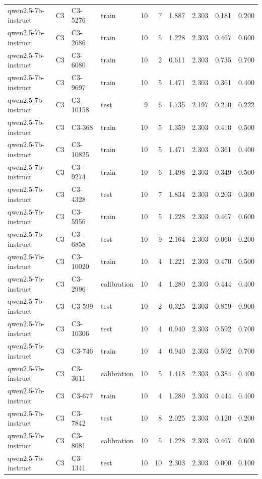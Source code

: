 \begin{table}
\begin{tabular}{llllrrrrrr}
qwen2.5-7b-instruct & C3 & C3-5276 & train & 10 & 7 & 1.887 & 2.303 & 0.181 & 0.200 \\
qwen2.5-7b-instruct & C3 & C3-2686 & train & 10 & 5 & 1.228 & 2.303 & 0.467 & 0.600 \\
qwen2.5-7b-instruct & C3 & C3-6080 & train & 10 & 2 & 0.611 & 2.303 & 0.735 & 0.700 \\
qwen2.5-7b-instruct & C3 & C3-9697 & train & 10 & 5 & 1.471 & 2.303 & 0.361 & 0.400 \\
qwen2.5-7b-instruct & C3 & C3-10158 & test & 9 & 6 & 1.735 & 2.197 & 0.210 & 0.222 \\
qwen2.5-7b-instruct & C3 & C3-368 & train & 10 & 5 & 1.359 & 2.303 & 0.410 & 0.500 \\
qwen2.5-7b-instruct & C3 & C3-10825 & train & 10 & 5 & 1.471 & 2.303 & 0.361 & 0.400 \\
qwen2.5-7b-instruct & C3 & C3-9274 & train & 10 & 6 & 1.498 & 2.303 & 0.349 & 0.500 \\
qwen2.5-7b-instruct & C3 & C3-4328 & test & 10 & 7 & 1.834 & 2.303 & 0.203 & 0.300 \\
qwen2.5-7b-instruct & C3 & C3-5956 & train & 10 & 5 & 1.228 & 2.303 & 0.467 & 0.600 \\
qwen2.5-7b-instruct & C3 & C3-6858 & test & 10 & 9 & 2.164 & 2.303 & 0.060 & 0.200 \\
qwen2.5-7b-instruct & C3 & C3-10020 & train & 10 & 4 & 1.221 & 2.303 & 0.470 & 0.500 \\
qwen2.5-7b-instruct & C3 & C3-2996 & calibration & 10 & 4 & 1.280 & 2.303 & 0.444 & 0.400 \\
qwen2.5-7b-instruct & C3 & C3-599 & test & 10 & 2 & 0.325 & 2.303 & 0.859 & 0.900 \\
qwen2.5-7b-instruct & C3 & C3-10306 & test & 10 & 4 & 0.940 & 2.303 & 0.592 & 0.700 \\
qwen2.5-7b-instruct & C3 & C3-746 & train & 10 & 4 & 0.940 & 2.303 & 0.592 & 0.700 \\
qwen2.5-7b-instruct & C3 & C3-3611 & calibration & 10 & 5 & 1.418 & 2.303 & 0.384 & 0.400 \\
qwen2.5-7b-instruct & C3 & C3-677 & train & 10 & 4 & 1.280 & 2.303 & 0.444 & 0.400 \\
qwen2.5-7b-instruct & C3 & C3-7842 & test & 10 & 8 & 2.025 & 2.303 & 0.120 & 0.200 \\
qwen2.5-7b-instruct & C3 & C3-8081 & calibration & 10 & 5 & 1.228 & 2.303 & 0.467 & 0.600 \\
qwen2.5-7b-instruct & C3 & C3-1341 & test & 10 & 10 & 2.303 & 2.303 & 0.000 & 0.100 \\

\end{tabular}
\end{table}

